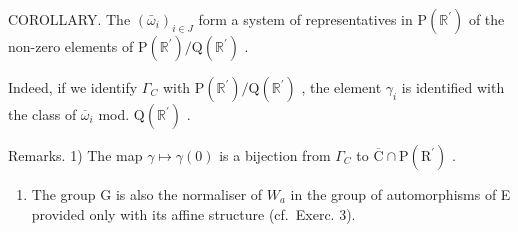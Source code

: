 COROLLARY. The \((\bar{\omega}_i)_{i\in J}\) form a system of representatives in \(\mathrm{P}(\mathbb{R}^{\prime})\) of the non-zero elements of \(\mathrm{P}(\mathbb{R}^{\prime}) / \mathrm{Q}(\mathbb{R}^{\prime})\) .

Indeed, if we identify \(\Gamma_{C}\) with \(\mathrm{P}(\mathbb{R}^{\prime}) / \mathrm{Q}(\mathbb{R}^{\prime})\) , the element \(\gamma_{i}\) is identified with the class of \(\overline{\omega}_{i}\) mod. \(\mathrm{Q}(\mathbb{R}^{\prime})\) .

Remarks. 1) The map \(\gamma \mapsto \gamma(0)\) is a bijection from \(\Gamma_{C}\) to \(\overline{\mathrm{C}} \cap \mathrm{P}(\mathrm{R}^{\prime})\) .

\begin{enumerate}
\def\labelenumi{\arabic{enumi})}
\setcounter{enumi}{1}
\tightlist
\item
  The group G is also the normaliser of \(W_{a}\) in the group of automorphisms of E provided only with its affine structure (cf.~Exerc. 3).
\end{enumerate}

